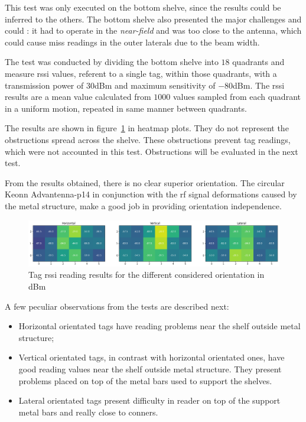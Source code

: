 This test was only executed on the bottom shelve, since the results could be inferred to the others. The bottom shelve also presented the major challenges and could : it had to operate in the \emph{near-field} and was too close to the antenna, which could cause miss readings in the outer laterals due to the beam width.

The test was conducted by dividing the bottom shelve into $18$ quadrants and measure \ac{rssi} values, referent to a single tag, within those quadrants, with a transmission power of $30$dBm and maximum sensitivity of $-80$dBm. The \ac{rssi} results are a mean value calculated from $1000$ values sampled from each quadrant in a uniform motion, repeated in same manner between quadrants.

The results are shown in figure~\ref{fig:tagorientationsresults} in heatmap plots.
They do not represent the obstructions spread across the shelve. These obstructions prevent tag readings, which were not accounted in this test. Obstructions will be evaluated in the next test.

From the results obtained, there is no clear superior orientation. The circular Keonn Advantenna-p14 in conjunction with the \ac{rf} signal deformations caused by the metal structure, make a good job in providing orientation independence.

\begin{figure}
    \centering
    \includegraphics[width=\textwidth]{figs/tests/RSSI_shelve1.png}
    \caption{Tag \ac{rssi} reading results for the different considered orientation in dBm}
    \label{fig:tagorientationsresults}
\end{figure}

A few peculiar observations from the tests are described next:

\begin{itemize}
    \item Horizontal orientated tags have reading problems near the shelf outside metal structure;
    \item Vertical orientated tags, in contrast with horizontal orientated ones, have good reading values near the shelf outside metal structure. They present problems placed on top of the metal bars used to support the shelves.
    \item Lateral orientated tags present difficulty in reader on top of the support metal bars and really close to conners.
\end{itemize}

